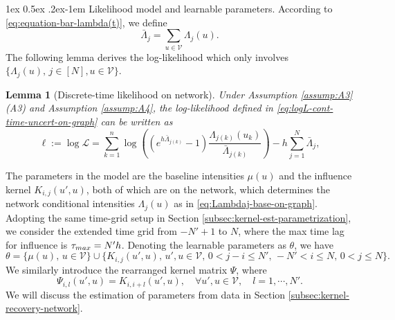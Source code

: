 \documentclass[11pt]{article}
\makeatletter
\newtheorem{lemma}[theorem]{Lemma}
\theoremstyle{remark}
\theoremstyle{plain}
\newcommand{\calL}{\mathcal{L}}
\newcommand{\calV}{\mathcal{V}}
\renewcommand{\paragraph}{%
  \@startsection{paragraph}{4}%
  {\z@}{1ex \@plus 0.5ex \@minus .2ex}{-1em}%
  {\normalfont\normalsize\itshape}%
}
\makeatother
\begin{document}
\paragraph{Likelihood model and learnable parameters.}
According to \eqref{eq:equation-bar-lambda(t)}, we define
\begin{equation}\label{eq:def-bar-Lambda}
\bar{\Lambda}_j = \sum_{u \in \calV} {\Lambda}_j(u).
\end{equation}
The following lemma derives the log-likelihood which only involves $\{ {\Lambda}_j(u), \, j \in [N], u \in \calV \}$.
\begin{lemma}[Discrete-time likelihood on network]
\label{lemma:l-lambda-base-on-graph}
Under Assumption \ref{assump:A3}(A3) and Assumption \ref{assump:A4}, %
the log-likelihood defined in  \eqref{eq:logL-cont-time-uncert-on-graph}  can be written as
\begin{equation}\label{eq:l-lambda-base-on-graph}
\ell := \log \calL 
= \sum_{k=1}^n \log \left(  (e^{  h \bar{\Lambda}_{j(k)}} -1) \frac{ \Lambda_{j(k)} (u_k)}{ \bar{\Lambda}_{j(k)}}
		\right) -   h  \sum_{j=1}^N  \bar{\Lambda}_j,
\end{equation}
\end{lemma}



The parameters in the model are the baseline intensities $\mu(u)$ and the influence kernel $K_{i,j}(u',u)$, both of which are on the network, which determines the network conditional intensities $\Lambda_j(u)$ as in \eqref{eq:Lambdaj-base-on-graph}. Adopting the same time-grid setup in Section \ref{subsec:kernel-est-parametrization}, we consider the extended time grid from $-N'+1$ to $N$, where the max time lag for influence is $\tau_{\rm max} = N' h$.
Denoting the learnable parameters as $\theta$,  we have
\begin{equation}\label{eq:def-theta-network-Omega}
\theta = \{ \mu(u), \, u\in \calV \} \cup \{ K_{i,j}(u', u), \, u' , u \in \calV, \, 
	0 <j-i \le N', \,  -N' < i \le N, \, 0 < j  \le N\}.
\end{equation}
We similarly introduce the rearranged kernel matrix $\Psi$, where
\begin{equation}
\label{eq:def-Psi-tensor}
\Psi_{i,l}(u',u) = K_{i, i+l} (u',u), \quad \forall u', u \in \calV, \quad l=1, \cdots, N'.
\end{equation}
We will discuss the estimation of parameters from data in Section \ref{subsec:kernel-recovery-network}.
\end{document}

